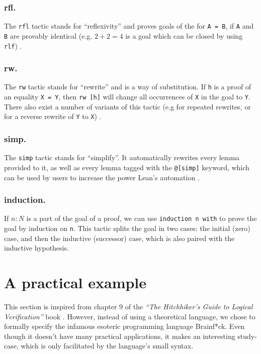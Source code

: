 \documentclass[runningheads]{llncs}
\newcommand{\cc}{\lstinline[mathescape]}
\begin{document}
\subsubsection{rfl.} The \cc{rfl} tactic stands for ``reflexivity'' and proves
goals of the for \cc{A = B}, if \cc{A} and \cc{B} are provably identical (e.g. $2 + 2 = 4$ is a goal which can be closed by using \cc{rlf}) \cite{natural}.
\vspace{-3mm}

\subsubsection{rw.} The \cc{rw} tactic stands for ``rewrite'' and is a way of
substitution. If \cc{h} is a proof of an equality \cc{X = Y}, then \cc{rw [h]}
will change all occurrences of \cc{X} in the goal to \cc{Y}. There also exist a
number of variants of this tactic (e.g for repeated rewrites, or for a reverse rewrite of \cc{Y} to \cc{X}) \cite{natural}.
\vspace{-3mm}

\subsubsection{simp.} The \cc{simp} tactic stands for ``simplify''. It
automatically rewrites every lemma provided to it, as well as every lemma
tagged with the \cc{@[simp]} keyword, which can be used by users to increase
the power Lean's automation \cite{natural}. \vspace{-3mm}

\subsubsection{induction.} If $n : N$ is a part of the goal of a proof, we
can use \cc{induction n with} to prove the goal by induction on \cc{n}. This
tactic splits the goal in two cases: the initial (zero) case, and then
the inductive (successor) case, which is also paired with the inductive hypothesis.

\section{A practical example}
\label{sec:bf}

This section is inspired from chapter 9 of the \emph{``The Hitchhiker’s Guide
to Logical Verification''} book \cite{hitchhiker}. However, instead of using a
theoretical language, we chose to formally specify the infamous esoteric
programming language Brainf*ck. Even though it doesn't have many practical
applications, it makes an interesting study-case, which is only facilitated by
the language's small syntax.
\end{document}
